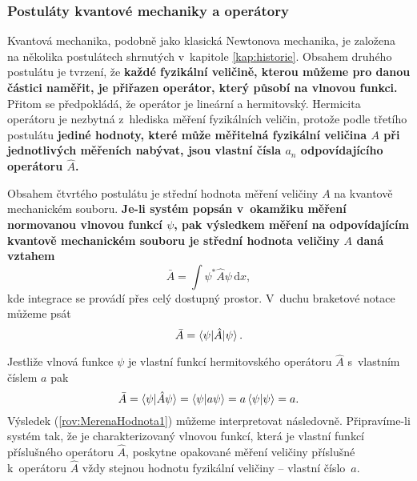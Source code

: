 \subsubsection{Postuláty kvantové mechaniky a operátory}
\label{kap:PostulatyKvantoveMechaniky}

Kvantová mechanika, podobně jako klasická Newtonova mechanika, je založena na několika postulátech shrnutých v~kapitole \ref{kap:historie}. Obsahem druhého postulátu je tvrzení, že \textbf{každé fyzikální veličině, kterou můžeme pro danou částici naměřit, je přiřazen operátor, který působí na vlnovou funkci.} Přitom se předpokládá, že operátor je lineární a hermitovský. Hermicita operátoru je nezbytná z~hlediska měření fyzikálních veličin, protože podle třetího postulátu \textbf{jediné hodnoty, které může měřitelná fyzikální veličina $A$ při jednotlivých měřeních nabývat, jsou vlastní čísla $a_n$ odpovídajícího operátoru $\hat{A}$.}

Obsahem čtvrtého postulátu je střední hodnota měření veličiny $A$ na kvantově mechanickém souboru. \textbf{Je-li systém popsán v~okamžiku měření normovanou vlnovou funkcí $\psi$, pak výsledkem měření na odpovídajícím kvantově mechanickém souboru je střední hodnota veličiny $A$ daná vztahem}
\begin{equation}
\boxed{\bar{A} = \int \psi^\ast \hat{A} \psi \,\mathrm{d}x,}
\label{rov:StředniHodnotaVeliciny}
\end{equation}
kde integrace se provádí přes celý dostupný prostor. V~duchu braketové notace můžeme psát
\begin{equation}
\bar{A} = \braket{\psi|\hat{A}|\psi} \mbox{.}
\nonumber
\end{equation}

Jestliže vlnová funkce $\psi$ je vlastní funkcí hermitovského operátoru $\hat{A}$ s~vlastním číslem $a$ pak
\begin{equation}
\bar{A} = \braket{\psi|\hat{A}\psi} = \braket{\psi|a\psi} = a \braket{\psi|\psi}=a \mbox{.}
\label{rov:MerenaHodnota1}
\end{equation}
Výsledek (\ref{rov:MerenaHodnota1}) můžeme interpretovat následovně. Připravíme-li systém tak, že je charakterizovaný vlnovou funkcí, která je vlastní funkcí příslušného operátoru $\hat{A}$, poskytne opakované měření veličiny příslušné k~operátoru $\hat{A}$ vždy stejnou hodnotu fyzikální veličiny -- vlastní číslo~$a$.

